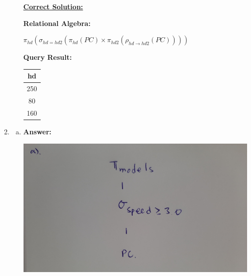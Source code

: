 \documentclass[12pt]{article}
\begin{document}
\begin{enumerate}
\begin{enumerate}[a)]
        \bigskip

        \begin{mdframed}
            \underline{\textbf{Correct Solution:}}

            \bigskip

            \color{red}

            \textbf{Relational Algebra:}

            \bigskip

            $\pi_{hd}(\sigma_{hd = hd2}(\pi_{hd}(PC) \times \pi_{hd2}(\rho_{hd \to hd2}(PC))))$

            \bigskip

            \textbf{Query Result:}

            \bigskip

            \begin{tabular}{|c|}
                \hline
                hd\\
                \hline
                250\\
                \hline
                80\\
                \hline
                160\\
                \hline
            \end{tabular}
            \color{black}
        \end{mdframed}

    \end{enumerate}

    \item

    \begin{enumerate}[a)]
        \item

        \textbf{Answer:}

        \bigskip

        \begin{center}
        \includegraphics[width=0.7\linewidth]{images/worksheet_2_solution_11.jpg}
        \end{center}


\end{enumerate}
\end{enumerate}
\end{document}

